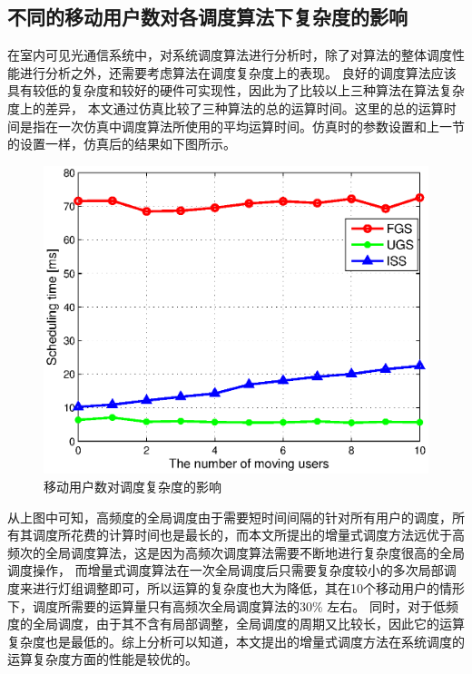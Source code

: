 \subsection{不同的移动用户数对各调度算法下复杂度的影响}
在室内可见光通信系统中，对系统调度算法进行分析时，除了对算法的整体调度性能进行分析之外，还需要考虑算法在调度复杂度上的表现。
良好的调度算法应该具有较低的复杂度和较好的硬件可实现性，因此为了比较以上三种算法在算法复杂度上的差异，
本文通过仿真比较了三种算法的总的运算时间。这里的总的运算时间是指在一次仿真中调度算法所使用的平均运算时间。仿真时的参数设置和上一节的设置一样，仿真后的结果如下图所示。

\begin{figure}[htbp]
    \centering
	\includegraphics[width=\textwidth]{figures/chapter-5/MovingUserNum2Complexity.eps}
	\caption{移动用户数对调度复杂度的影响}
	\label{fig:moving-user-num-2-complexity}
\end{figure}

从上图中可知，高频度的全局调度由于需要短时间间隔的针对所有用户的调度，所有其调度所花费的计算时间也是最长的，而本文所提出的增量式调度方法远优于高频次的全局调度算法，这是因为高频次调度算法需要不断地进行复杂度很高的全局调度操作，
而增量式调度算法在一次全局调度后只需要复杂度较小的多次局部调度来进行灯组调整即可，所以运算的复杂度也大为降低，其在10个移动用户的情形下，调度所需要的运算量只有高频次全局调度算法的30\% 左右。
同时，对于低频度的全局调度，由于其不含有局部调整，全局调度的周期又比较长，因此它的运算复杂度也是最低的。综上分析可以知道，本文提出的增量式调度方法在系统调度的运算复杂度方面的性能是较优的。


